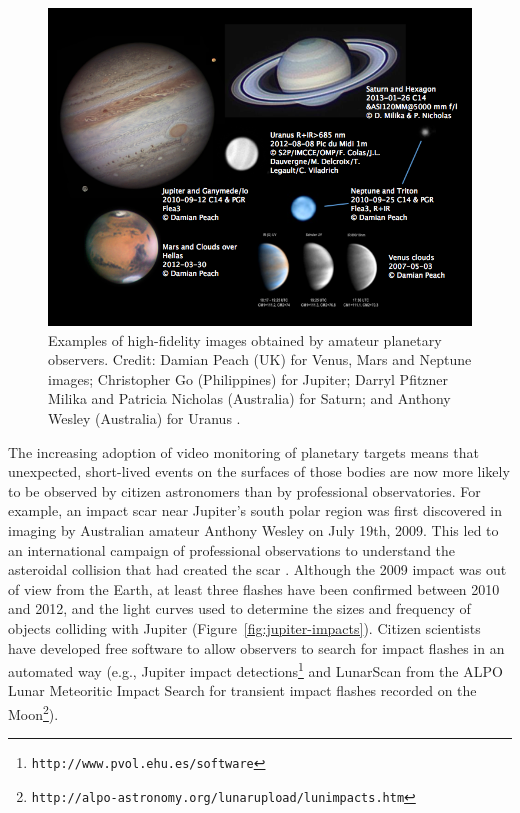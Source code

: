 \documentclass{ar2e}
\def\Fref#1{Figure~\ref{#1}\xspace}
\def\CaseStudy#1{\noindent{\it\bf #1 \,\,\,\,}}
\def\url#1{\texttt{#1}}
\begin{document}
\begin{figure}[!ht]
\centering\includegraphics[width=\linewidth]{figs/planets.png}
\caption{Examples of high-fidelity images obtained by amateur planetary
observers.  Credit:  Damian Peach (UK) for Venus, Mars and Neptune images;
Christopher Go (Philippines) for Jupiter; Darryl Pfitzner Milika and Patricia
Nicholas (Australia) for Saturn; and Anthony Wesley (Australia) for Uranus
\citep[see][for a thorough review of amateur planetary
astronomy]{14mousis_proam}.}
\label{fig:planets}
\end{figure}



\CaseStudy{Solar System Impacts.}
The increasing adoption of video monitoring of planetary targets means that
unexpected, short-lived events on the surfaces of those bodies 
are now more likely to be observed by citizen
astronomers than by professional observatories.  For example, an impact scar
near Jupiter's south polar region was first discovered in imaging by Australian
amateur Anthony Wesley on July 19th, 2009. This led to an international campaign
of professional observations to understand the asteroidal collision that had
created the scar \citep[e.g.,][]{10hammel,10depater,11orton}.  Although the 2009
impact was out of view from the Earth, at least three flashes have been
confirmed between 2010 and 2012, and the light curves used to determine the
sizes and frequency of objects colliding with Jupiter \citep[e.g.,][]{13hueso}
(\Fref{fig:jupiter-impacts}).  Citizen scientists have developed free software
to allow observers to search for impact flashes in an automated way (e.g.,
Jupiter impact detections\footnote{\url{http://www.pvol.ehu.es/software}} and
LunarScan from the ALPO Lunar Meteoritic Impact Search for transient impact
flashes recorded on the Moon\footnote{\url{http://alpo-astronomy.org/lunarupload/lunimpacts.htm}}).  
\end{document}

